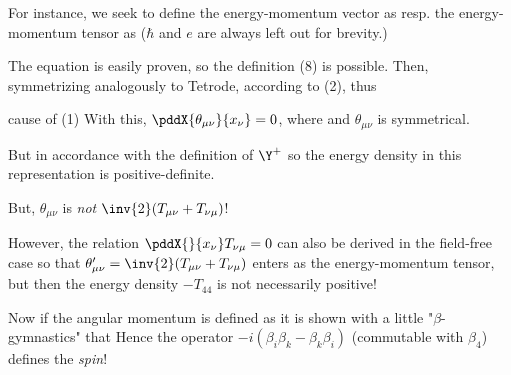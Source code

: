 For instance, we seek to define the energy-momentum vector as
resp. the energy-momentum tensor as
($\hbar$ and $e$ are always left out for brevity.)

The equation
is easily proven, so the definition (8) is possible. Then, symmetrizing analogously to Tetrode,
according to (2),
thus 

cause of (1)
With this, $\pddX{\theta_{\mu\nu}}{x_\nu} = 0$, where
and $\theta_{\mu\nu}$ is symmetrical.

But in accordance with the definition of $\Y^+$
so the energy density in this representation is positive-definite.

But, $\theta_{\mu\nu}$ is \textit{not} $\inv{2}(T_{\mu\nu} + T_{\nu\mu})$!

However, the relation $\pddX{}{x_\nu}T_{\nu\mu}=0$ can also be derived in the field-free case so that $\theta'_{\mu\nu}=\inv{2}(T_{\mu\nu}+T_{\nu\mu})$ enters as the energy-momentum tensor, but then the energy density $-T_{44}$ is not necessarily positive!

Now if the angular momentum is defined as
it is shown with a little "$\beta$-gymnastics" that
Hence the operator $-i(\beta_i\beta_k-\beta_k\beta_i)$ (commutable with $\beta_4$) defines the \textit{spin}!

